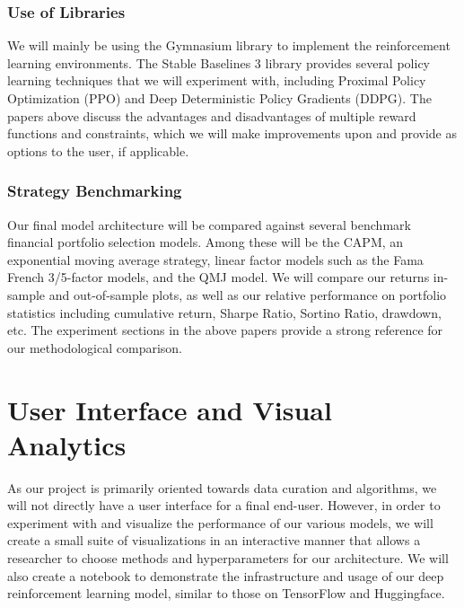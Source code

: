 \subsubsection{Use of Libraries}

We will mainly be using the Gymnasium library to implement the reinforcement learning environments. 
The Stable Baselines 3 library provides several policy learning techniques that we will experiment with, 
including Proximal Policy Optimization (PPO) and Deep Deterministic Policy Gradients (DDPG). 
The papers above discuss the advantages and disadvantages of multiple reward functions and constraints, 
which we will make improvements upon and provide as options to the user, if applicable.

\subsubsection{Strategy Benchmarking}

Our final model architecture will be compared against several benchmark financial portfolio selection 
models. Among these will be the CAPM, an exponential moving average strategy, linear factor models 
such as the Fama French 3/5-factor models, and the QMJ model. We will compare our returns 
in-sample and out-of-sample plots, as well as our relative performance on portfolio statistics 
including cumulative return, Sharpe Ratio, Sortino Ratio, drawdown, etc. The experiment sections 
in the above papers provide a strong reference for our methodological comparison.

\section{User Interface and Visual Analytics}

As our project is primarily oriented towards data curation and algorithms, we will not directly have a 
user interface for a final end-user. However, in order to experiment with and visualize the performance 
of our various models, we will create a small suite of visualizations in an interactive manner that 
allows a researcher to choose methods and hyperparameters for our architecture. We will also create a 
notebook to demonstrate the infrastructure and usage of our deep reinforcement learning model, 
similar to those on TensorFlow and Huggingface.
